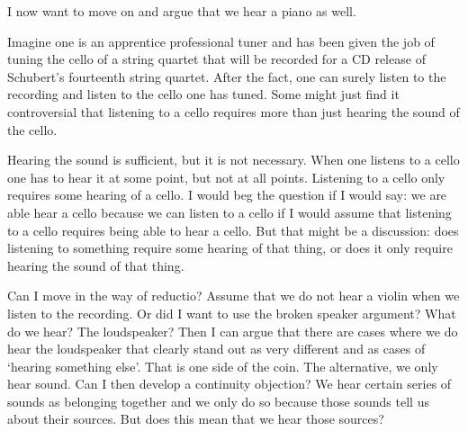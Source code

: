 \documentclass[sloppy, journal, git, bytitle, dodraft]{humapap}
\begin{document}

\sect I now want to move on and argue that we hear a piano as well. 

Imagine one is an apprentice professional tuner and has been given the job of tuning the cello of a string quartet that will be recorded for a CD release of Schubert's fourteenth string quartet. After the fact, one can surely listen to the recording and listen to the cello one has tuned. Some might just find it controversial that listening to a cello requires more than just hearing the sound of the cello.

Hearing the sound is sufficient, but it is not necessary. When one listens to a cello one has to hear it at some point, but not at all points. Listening to a cello only requires some hearing of a cello. I would beg the question if I would say: we are able hear a cello because we can listen to a cello if I would assume that listening to a cello requires being able to hear a cello. But that might be a discussion: does listening to something require some hearing of that thing, or does it only require hearing the sound of that thing. 

Can I move in the way of reductio? Assume that we do not hear a violin when we listen to the recording. Or did I want to use the broken speaker argument? What do we hear? The loudspeaker? Then I can argue that there are cases where we do hear the loudspeaker that clearly stand out as very different and as cases of `hearing something else'. That is one side of the coin. The alternative, we only hear sound. Can I then develop a continuity objection? We hear certain series of sounds as belonging together and we only do so because those sounds tell us about their sources. But does this mean that we hear those sources? 
\end{document}
